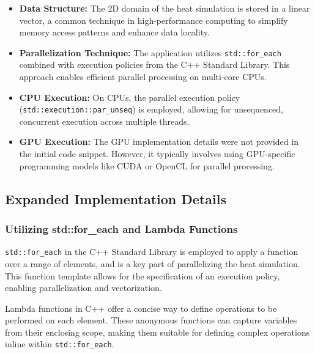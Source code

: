 \documentclass[11pt]{article}
\begin{document}
    \begin{itemize}

    \item
      \textbf{Data Structure:} The 2D domain of the heat simulation is
      stored in a linear vector, a common technique in high-performance
      computing to simplify memory access patterns and enhance data
      locality.
    \item
      \textbf{Parallelization Technique:} The application utilizes
      \texttt{std::for\_each} combined with execution policies from the C++
      Standard Library. This approach enables efficient parallel processing
      on multi-core CPUs.
    \item
      \textbf{CPU Execution:} On CPUs, the parallel execution policy
      (\texttt{std::execution::par\_unseq}) is employed, allowing for
      unsequenced, concurrent execution across multiple threads.
    \item
      \textbf{GPU Execution:} The GPU implementation details were not
      provided in the initial code snippet. However, it typically involves
      using GPU-specific programming models like CUDA or OpenCL for parallel
      processing.
    \end{itemize}

    \hypertarget{expanded-implementation-details}{%
    \subsection{Expanded Implementation Details}\label{expanded-implementation-details}}

    \hypertarget{utilizing-stdfor_each-and-lambda-functions}{%
    \subsubsection{Utilizing std::for\_each and Lambda Functions}\label{utilizing-stdfor_each-and-lambda-functions}}

    \texttt{std::for\_each} in the C++ Standard Library is employed to apply a function over a range of elements, and is a key part of parallelizing the heat simulation. This function template allows for the specification of an execution policy, enabling parallelization and vectorization.

    Lambda functions in C++ offer a concise way to define operations to be performed on each element. These anonymous functions can capture variables from their enclosing scope, making them suitable for defining complex operations inline within \texttt{std::for\_each}.
\end{document}
